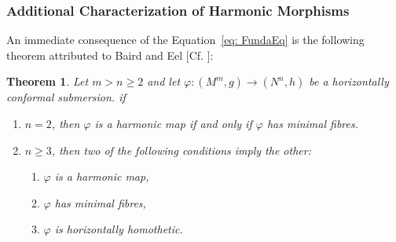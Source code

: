 \documentclass[12pt]{article}
\newtheorem{theorem}{Theorem}[section]
\theoremstyle{definition}
\numberwithin{equation}{subsection}
\begin{document}
\subsubsection{Additional Characterization of Harmonic Morphisms}
An immediate consequence of the Equation~\ref{eq: FundaEq} is the following theorem attributed to Baird and Eel [Cf. \cite{Bai-Eel}]:
\begin{theorem}
Let $m>n\geq 2$ and let $\varphi: (M^m, g) \rightarrow (N^n, h)$ be a horizontally conformal submersion. if \begin{enumerate}
    \item $n=2$, then $\varphi$ is a harmonic map if and only if $\varphi$ has minimal fibres.
    \item $n \geq 3$, then two of the following conditions imply the other:
    \begin{enumerate}
        \item $\varphi$ is a harmonic map,
        \item $\varphi$ has minimal fibres,
        \item $\varphi$ is horizontally homothetic.
    \end{enumerate}
\end{enumerate}
\end{theorem}
\end{document}
